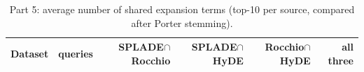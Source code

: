 \begin{table}[ht]\centering\small
\begin{tabular}{lrrrrr}\toprule
Dataset & queries & SPLADE$\cap$Rocchio & SPLADE$\cap$HyDE & Rocchio$\cap$HyDE & all three \\ \midrule

\bottomrule\end{tabular}
\caption{Part 5: average number of shared expansion terms (top-10 per source, compared after Porter stemming).}\label{tab:p5ov}\end{table}
